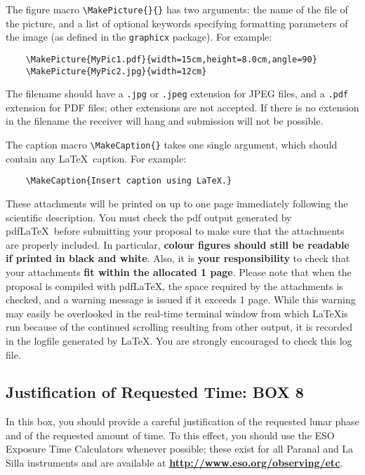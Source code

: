 \documentclass{article}
\begin{document}
The figure macro \verb|\MakePicture{}{}| has two arguments: the name
of the file of the picture, and a list of optional keywords specifying
formatting parameters of the image (as defined in the {\tt graphicx}
package). For example:
\begin{verbatim}
    \MakePicture{MyPic1.pdf}{width=15cm,height=8.0cm,angle=90}
    \MakePicture{MyPic2.jpg}{width=12cm}
\end{verbatim}
The filename should have a {\tt .jpg} or {\tt .jpeg} extension for
JPEG files, and a {\tt .pdf} extension for PDF files; other extensions
are not accepted. If there is no extension in the filename the receiver
will hang and submission will not be possible.

The  caption macro \verb|\MakeCaption{}| takes one single  argument,
which should contain any \LaTeX\ caption. For example:
\begin{verbatim}
    \MakeCaption{Insert caption using LaTeX.}
\end{verbatim}

These attachments will be printed on up to one page
immediately following the scientific description. You must check the
pdf output generated by pdf\LaTeX\ before submitting your proposal to
make sure that the attachments are properly included. In particular,
{\bf colour figures should still be readable if printed in  
black and white}. Also,
it is {\bf your responsibility} to check that your attachments 
{\bf fit within the allocated 1 page}. Please note that
when the proposal is compiled with pdf\LaTeX, the space required by
the attachments is checked, and a warning message is issued if it 
exceeds 1 page. While this warning may easily be overlooked in the
real-time terminal window from which \LaTeX is run because of the
continued scrolling resulting from other output, it is recorded in the
logfile generated by LaTeX. You are strongly encouraged to check
this log file.

\subsection{Justification of Requested Time: {\bf BOX 8}}

In this box, you should provide a careful justification of the
requested lunar phase and of the requested amount of time. 
To this effect, you should use the ESO Exposure
Time Calculators whenever possible; these exist for all Paranal and La Silla
instruments and are available at
\href{http://www.eso.org/observing/etc}{\bf
  \underline{http://www.eso.org/observing/etc}}. 
\end{document}

